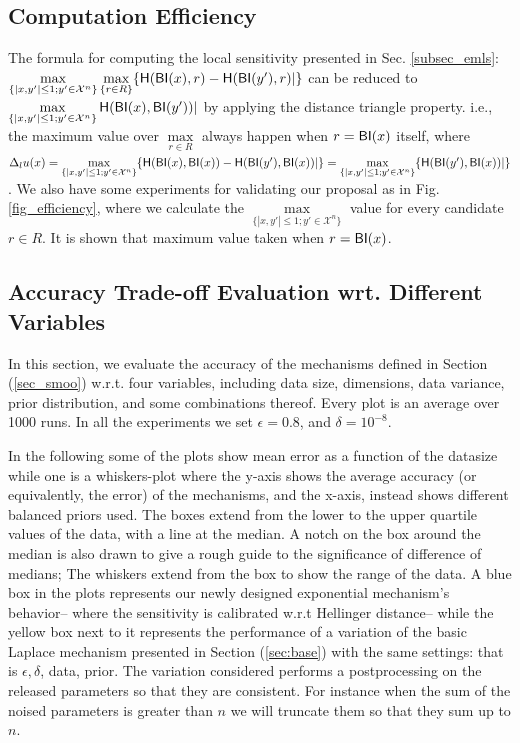 \documentclass[sigconf]{acmart}
\begin{document}
\subsection{Computation Efficiency}
\label{subsec_effi}
The formula for computing the local sensitivity presented in Sec. \ref{subsec_emls}:$\max\limits_{\{|x,y'| \leq 1; y'\in \mathcal{X}^n\}}\max\limits_{\{r\in R\}} \{\mathsf{H}(\mathsf{BI}(x), r) - \mathsf{H}(\mathsf{BI}(y'), r)|\}$ can be reduced to $\max\limits_{\{|x,y'| \leq 1;y'\in \mathcal{X}^n\}}\mathsf{H}(\mathsf{BI}(x), \mathsf{BI}(y'))|$ by applying the distance triangle property. i.e., the maximum value over $\max\limits_{r \in R}$ always happen when $r = \mathsf{BI}(x)$ itself, where $\Delta_{l}u(x) = \max\limits_{\{|x,y'| \leq 1;y'\in \mathcal{X}^n\}} \{\mathsf{H}(\mathsf{BI}(x), \mathsf{BI}(x)) - \mathsf{H}(\mathsf{BI}(y'), \mathsf{BI}(x))|\} = \max\limits_{\{|x,y'| \leq 1;y'\in \mathcal{X}^n\}} \{\mathsf{H}(\mathsf{BI}(y'), \mathsf{BI}(x))|\}$. We also have some experiments for validating our proposal as in Fig. \ref{fig_efficiency}, where we calculate the $\max\limits_{\{|x,y'| \leq 1;y'\in \mathcal{X}^n\}}$ value for every candidate $r \in R$. It is shown that maximum value taken when  $r = \mathsf{BI}(x)$.


\subsection{Accuracy Trade-off Evaluation wrt. Different Variables}
\label{subsec_vs_variables}
In this section, we evaluate the accuracy of the mechanisms defined in
Section (\ref{sec_smoo}) w.r.t. four variables, including data size, dimensions,
data variance, prior distribution, and some combinations thereof.
Every plot is an average over 1000 runs. In all the experiments we set
$\epsilon = 0.8$, and $\delta = 10^{-8}$.

\noindent In the following some of the plots show
mean error as a function of the datasize while one
is a whiskers-plot where the y-axis shows the average
accuracy (or equivalently, the error) of the mechanisms, and the x-axis, instead shows
different balanced priors used. The boxes extend from the lower to the upper quartile values
of the data, with a line at the median. A notch on the box around the
median is also drawn to give a rough guide to the significance of
difference of medians; The whiskers extend from the box to show the
range of the data. A blue box in the plots represents our newly
designed exponential mechanism's behavior-- where the sensitivity is calibrated
w.r.t Hellinger distance-- while the yellow box next to
it represents the performance of a variation of the basic Laplace
mechanism presented in Section (\ref{sec:base}) with the same
settings: that is $\epsilon, \delta$, data, prior. The variation
considered performs a postprocessing on the released parameters so
that they are consistent. For instance when the sum of the noised
parameters is greater than $n$ we will truncate them so that they sum
up to $n$.
\end{document}
